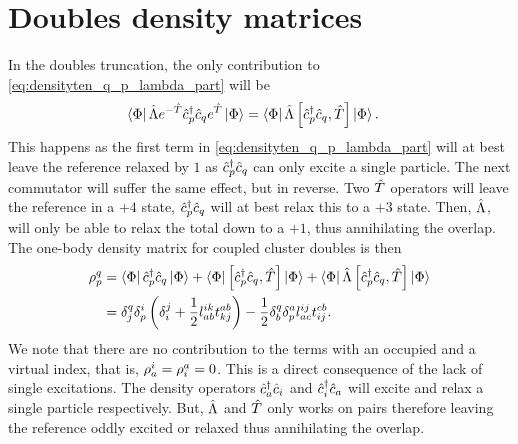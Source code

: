     \section{Doubles density matrices}
        In the doubles truncation, the only contribution to
        \autoref{eq:densityten_q_p_lambda_part} will be
        \begin{align}
            \bra{\Phi}\hat{\Lambda} e^{-\hat{T}}\hat{c}_{p}^{\dagger}\hat{c}_{q}e^{\hat{T}}\ket{\Phi}
            &= \bra{\Phi}\hat{\Lambda} \left[\hat{c}_{p}^{\dagger}\hat{c}_{q}, \hat{T}\right]\ket{\Phi}.
        \end{align}
        This happens as the first term in \autoref{eq:densityten_q_p_lambda_part} will
        at best leave the reference relaxed by $1$ as $\hat{c}_{p}^{\dagger}\hat{c}_{q}$ can only
        excite a single particle. The next commutator will suffer the same
        effect, but in reverse. Two $\hat{T}$ operators will leave the reference in a
        $+4$ state, $\hat{c}_{p}^{\dagger}\hat{c}_{q}$ will at best relax this to a $+3$ state.
        Then, $\hat{\Lambda}$, will only be able to relax the total down to a $+1$,
        thus annihilating the overlap. The one-body density matrix for coupled
        cluster doubles is then
        \begin{align}
            \rho^{q}_{p}
            &= \bra{\Phi}\hat{c}_{p}^{\dagger}\hat{c}_{q}\ket{\Phi}
            + \bra{\Phi}\left[\hat{c}_{p}^{\dagger}\hat{c}_{q}, \hat{T}\right]\ket{\Phi}
            + \bra{\Phi}\hat{\Lambda} \left[\hat{c}_{p}^{\dagger}\hat{c}_{q}, \hat{T}\right]\ket{\Phi}
            \\
            &=
            \delta^{q}_{j} \delta^{i}_{p} \left( 
                \delta^{j}_{i}
                + \frac{1}{2} l^{ik}_{ab} t^{ab}_{kj}
             \right)
            - \frac{1}{2} \delta^{q}_{b} \delta^{a}_{p} l^{ij}_{ac} t^{cb}_{ij}.
        \end{align}
        We note that there are no contribution to the terms with an occupied and
        a virtual index, that is, $\rho^{i}_{a} = \rho^{a}_{i} = 0$. This is a
        direct consequence of the lack of single excitations. The density
        operators $\hat{c}_{a}^{\dagger}\hat{c}_{i}$ and $\hat{c}_{i}^{\dagger}\hat{c}_{a}$ will excite and relax a
        single particle respectively. But, $\hat{\Lambda}$ and $\hat{T}$ only works on pairs
        therefore leaving the reference oddly excited or relaxed thus
        annihilating the overlap.

